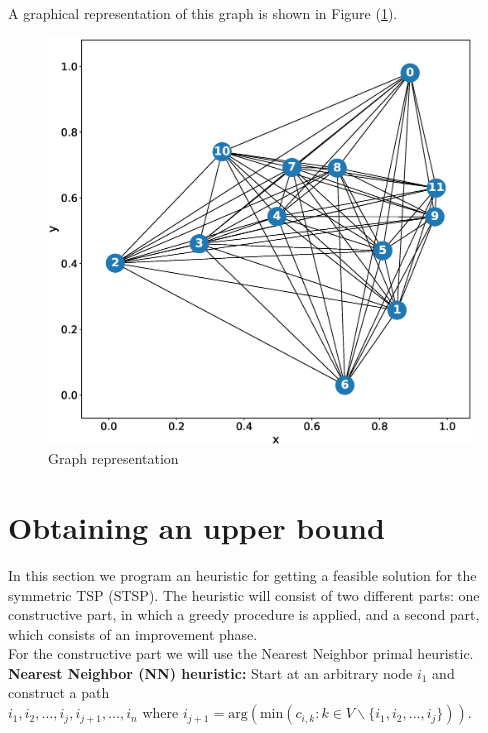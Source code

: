 \documentclass[12pt]{article}
\newenvironment{code}{\captionsetup{type=listing}}{}
\begin{document}
A graphical representation of this graph is shown in Figure (\ref{f1}).

\begin{figure}[H]
\centering
    \includegraphics[width=1\linewidth]{1.eps} 
  \caption{Graph representation}
  \label{f1}
\end{figure}

\begin{code}
\label{ll1}
\end{code}


\section{Obtaining an upper bound}
In this section we program an heuristic for getting a feasible solution for the symmetric TSP (STSP). The heuristic will consist of two different parts: one constructive part, in which a greedy procedure is applied, and a second part, which consists of an improvement phase.\\

For the constructive part we will use the Nearest Neighbor primal heuristic.\\

\textbf{Nearest Neighbor (NN) heuristic:} Start at an arbitrary node $i_{1}$ and construct a path\\ $i_{1},i_{2},\dots,i_{j},i_{j+1},\dots,i_{n}$ where $i_{j+1} = \text{arg}(\text{min}(c_{i,k}: k \in V \backslash \{i_{1},i_{2},\dots,i_{j} \} ))$.\\
\end{document}
